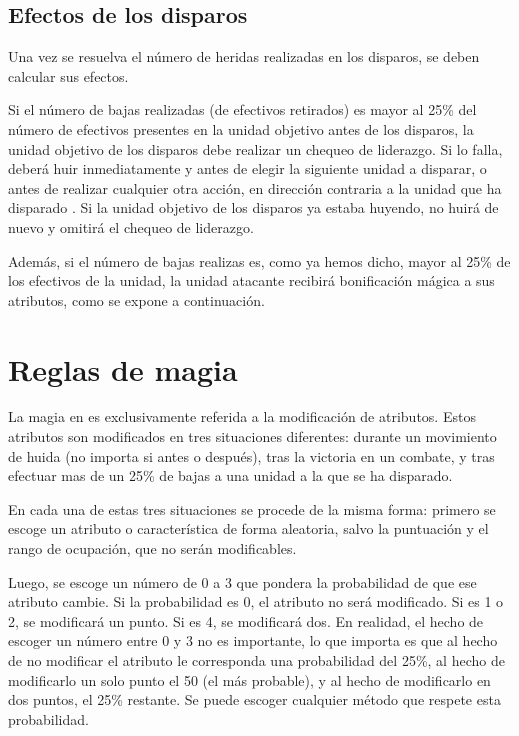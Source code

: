 \subsection*{Efectos de los disparos}
\label{efectosdisparos}
Una vez se resuelva el número de heridas realizadas en los disparos,
se deben calcular sus efectos.

Si el número de bajas realizadas (de efectivos retirados) es mayor al 25\% del número de
efectivos presentes en la unidad objetivo antes de los disparos, la
unidad objetivo de los disparos debe realizar un chequeo de
liderazgo. Si lo falla, deberá huir inmediatamente y antes de elegir
la siguiente unidad a disparar, o antes de realizar cualquier otra
acción, en dirección contraria a la unidad
que ha disparado . Si la unidad objetivo de los
disparos ya estaba huyendo, no huirá
de nuevo y omitirá el chequeo de liderazgo.

Además, si el número de bajas realizas es, como ya hemos dicho, mayor
al 25\% de los efectivos de la unidad, la unidad atacante recibirá
bonificación mágica a sus atributos, como se expone a continuación.

\section*{Reglas de magia}
\label{magia}
La magia en \gom es exclusivamente referida a la modificación de
atributos. Estos atributos son modificados en tres situaciones
diferentes: durante un movimiento de huida (no importa si antes o
después), tras la victoria en un
combate, y tras efectuar mas de un 25\% de bajas a una unidad a la que
se ha disparado.

En cada una de estas tres situaciones se procede de la misma forma:
primero se escoge un atributo o característica de forma aleatoria,
salvo la puntuación y el rango de ocupación, que no serán
modificables.

Luego, se escoge un número de 0 a 3 que pondera la probabilidad de que
ese atributo cambie. Si la probabilidad es 0, el atributo no será
modificado. Si es 1 o 2, se modificará un punto. Si es 4, se
modificará dos. En realidad, el hecho de escoger un número entre 0 y 3
no es importante, lo que importa es que al hecho de no modificar el
atributo le corresponda una probabilidad del 25\%, al hecho de
modificarlo un solo punto el 50 (el más probable), y al hecho de
modificarlo en dos puntos, el 25\% restante. Se puede escoger
cualquier método que respete esta probabilidad.

